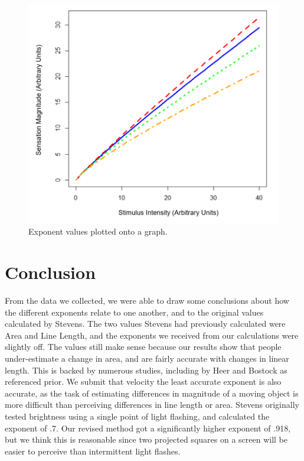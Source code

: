 \documentclass{article}
\begin{document}
\begin{multicols}{2}
\begin{figure}[H]
    \centering
    \includegraphics[width = \columnwidth]{exponents}
    \caption{Exponent values plotted onto a graph.}
    \label{fig:exponents}
\end{figure}

\section{Conclusion}
From the data we collected, we were able to draw some conclusions about how the different exponents relate to one another, and to the original values calculated by Stevens. The two values Stevens had previously calculated were Area and Line Length, and the exponents we received from our calculations were slightly off. The values still make sense because our results show that people under-estimate a change in area, and are fairly accurate with changes in linear length. \citep{bernasconi2016we} This is backed by numerous studies, including by Heer and Bostock as referenced prior. We submit that velocity the least accurate exponent is also accurate, as the task of estimating differences in magnitude of a moving object is more difficult than perceiving differences in line length or area. Stevens originally tested brightness using a single point of light flashing, and calculated the exponent of .7. Our revised method got a significantly higher exponent of .918, but we think this is reasonable since two projected squares on a screen will be easier to perceive than intermittent light flashes. 


\end{multicols}
\end{document}
